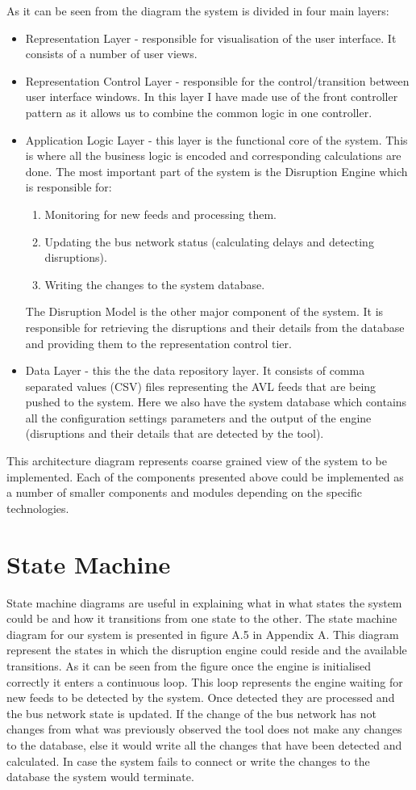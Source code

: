 As it can be seen from the diagram the system is divided in four main layers:
\begin{itemize}
	\item Representation Layer - responsible for visualisation of the user interface. It consists of a number of user views.
	\item Representation  Control Layer - responsible for the control/transition between user interface windows. In this layer I have made use of the front controller pattern \cite{fowler2003patterns} as it allows us to combine the common logic in one controller.
	\item Application Logic Layer -  this layer is the functional core of the system. This is where all the business logic is encoded and corresponding calculations are done. The most important part of the system is the Disruption Engine which is responsible for:
	\begin{enumerate}
		\item Monitoring for new feeds and processing them.
		\item Updating the bus network status (calculating delays and detecting disruptions).
		\item Writing the changes to the system database.
	\end{enumerate}
	The Disruption Model is the other major component of the system. It is responsible for retrieving the disruptions and their details from the database and providing them to the representation control tier.
	\item Data Layer - this the the data repository layer. It consists of comma separated values (CSV) files representing the AVL feeds that are being pushed to the system. Here we also have the system database which contains all the configuration settings parameters and the output of the engine (disruptions and their details that are detected by the tool).
\end{itemize}
This architecture diagram represents coarse grained view of the system to be implemented. Each of the components presented above could be implemented as a number of smaller components and modules depending on the specific technologies.

\section{State Machine}
State machine diagrams are useful in explaining what in what states the system could be and how it transitions from one state to the other. The state machine diagram for our system is presented in figure A.5 in Appendix A. This diagram represent the states in which the disruption engine could reside and the available transitions. As it can be seen from the figure once the engine is initialised correctly it enters a continuous loop. This loop represents the engine waiting for new feeds to be detected by the system. Once detected they are processed and the bus network state is updated. If the change of the bus network has not changes from what was previously observed the tool does not make any changes to the database, else it would write all the changes that have been detected and calculated. In case the system fails to connect or write the changes to the database the system would terminate.

